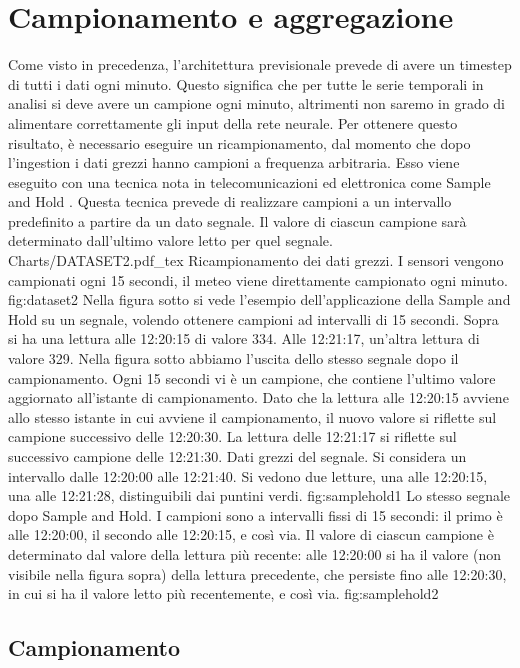 \section{Campionamento e aggregazione}
Come visto in precedenza, l’architettura previsionale prevede di avere un timestep di tutti i dati ogni minuto. Questo significa che per tutte le serie temporali in analisi si deve avere un campione ogni minuto, altrimenti non saremo in grado di alimentare correttamente gli input della rete neurale. Per ottenere questo risultato, è necessario eseguire un ricampionamento, dal momento che dopo l’ingestion i dati grezzi hanno campioni a frequenza arbitraria. Esso viene eseguito con una tecnica nota in telecomunicazioni ed elettronica come Sample and Hold \cite{kefauver_patschke_2007}. Questa tecnica prevede di realizzare campioni a un intervallo predefinito a partire da un dato segnale. Il valore di ciascun campione sarà determinato dall’ultimo valore letto per quel segnale.
\svg
{Charts/DATASET2.pdf_tex}
{Ricampionamento dei dati grezzi. I sensori vengono campionati ogni 15 secondi, il meteo viene direttamente campionato ogni minuto. }
{fig:dataset2}
Nella figura sotto si vede l’esempio dell’applicazione della Sample and Hold su un segnale, volendo ottenere campioni ad intervalli di 15 secondi. Sopra si ha una lettura alle 12:20:15 di valore 334. Alle 12:21:17, un’altra lettura di valore 329. Nella figura sotto abbiamo l’uscita dello stesso segnale dopo il campionamento. Ogni 15 secondi vi è un campione, che contiene l’ultimo valore aggiornato all’istante di campionamento. Dato che la lettura alle 12:20:15 avviene allo stesso istante in cui avviene il campionamento, il nuovo valore si riflette sul campione successivo delle 12:20:30. La lettura delle 12:21:17 si riflette sul successivo campione delle 12:21:30.
{Dati grezzi del segnale. Si considera un intervallo dalle 12:20:00 alle 12:21:40. Si vedono due letture, una alle 12:20:15, una alle 12:21:28, distinguibili dai puntini verdi.}
{fig:samplehold1}
{Lo stesso segnale dopo Sample and Hold. I campioni sono a intervalli fissi di 15 secondi: il primo è alle 12:20:00, il secondo alle 12:20:15, e così via. Il valore di ciascun campione è determinato dal valore della lettura più recente: alle 12:20:00 si ha il valore (non visibile nella figura sopra) della lettura precedente, che persiste fino alle 12:20:30, in cui si ha il valore letto più recentemente, e così via.}
{fig:samplehold2}
\subsection{Campionamento}\label{sample}
